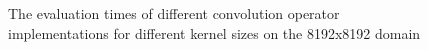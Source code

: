 \begin{figure}[!ht]

\caption{The evaluation times of different convolution operator implementations for different kernel sizes on the 8192x8192 domain}
\label{fig:convolve-result}

\end{figure}